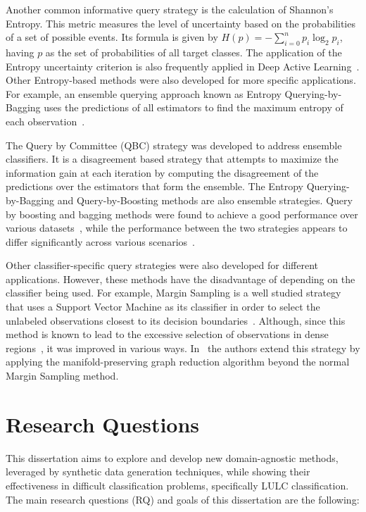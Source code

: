 Another common informative query strategy is the calculation of Shannon's
Entropy. This metric measures the level of uncertainty
based on the probabilities of a set of possible events. Its formula is given
by $H(p)=-\sum_{i=0}^n{p_i\log_2{p_i}}$, having $p$ as the set of
probabilities of all target classes. The application of the Entropy
uncertainty criterion is also frequently applied in Deep Active
Learning~\cite{Aghdam2019}. Other Entropy-based methods were also developed
for more specific applications. For example, an ensemble querying approach
known as Entropy Querying-by-Bagging uses the predictions of all estimators to
find the maximum entropy of each observation~\cite{Abe1998}.

The Query by Committee (QBC) strategy was developed to address ensemble
classifiers. It is a disagreement based strategy that attempts to maximize the
information gain at each iteration by computing the disagreement of the
predictions over the estimators that form the ensemble. The Entropy
Querying-by-Bagging and Query-by-Boosting methods are also ensemble
strategies. Query by boosting and bagging methods were found to achieve a good
performance over various datasets~\cite{Melville2004}, while the performance
between the two strategies appears to differ significantly across various
scenarios~\cite{Bloodgood2018}.

Other classifier-specific query strategies were also developed for different
applications. However, these methods have the disadvantage of depending on the
classifier being used. For example, Margin Sampling is a well studied strategy
that uses a Support Vector Machine as its classifier in order to select the
unlabeled observations closest to its decision boundaries~\cite{Kumar2020}.
Although, since this method is known to lead to the excessive selection of
observations in dense regions~\cite{Zhou2014}, it was improved in various
ways. In~\cite{Zhou2014} the authors extend this strategy by applying the
manifold-preserving graph reduction algorithm beyond the normal Margin
Sampling method.


\section{Research Questions}

This dissertation aims to explore and develop new domain-agnostic methods,
leveraged by synthetic data generation techniques, while showing their
effectiveness in difficult classification problems, specifically LULC
classification. The main research questions (RQ) and goals of this
dissertation are the following:

